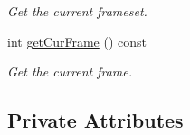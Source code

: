 \begin{DoxyCompactItemize}
\begin{DoxyCompactList}\small\item\em Get the current frameset. \end{DoxyCompactList}\item 
int \hyperlink{classObject_a21b245ca66eaee32f3d942759c0de620}{get\+Cur\+Frame} () const \hypertarget{classObject_a21b245ca66eaee32f3d942759c0de620}{}\label{classObject_a21b245ca66eaee32f3d942759c0de620}

\begin{DoxyCompactList}\small\item\em Get the current frame. \end{DoxyCompactList}\end{DoxyCompactItemize}
\subsection*{Private Attributes}
